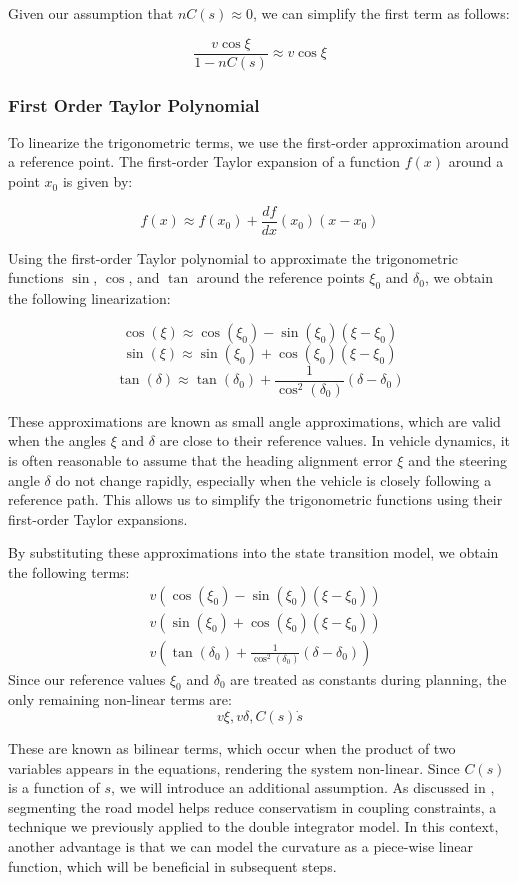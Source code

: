 Given our assumption that $nC(s) \approx 0$, we can simplify the first term as follows:

\[ \frac{v \cos\xi}{1 - nC(s)} \approx v
	\cos\xi \]

\subsubsection{First Order Taylor Polynomial} To linearize the trigonometric terms, we use the first-order
approximation around a reference point.
The first-order Taylor expansion of a function $f(x)$ around a point $x_0$ is given by:

\[ f(x) \approx f(x_0) + \frac{df}{dx}
	(x_0) (x - x_0) \]

Using the first-order Taylor polynomial to approximate the trigonometric functions $\sin$, $\cos$, and $\tan$
around the reference points $\xi_0$ and $\delta_0$, we obtain the following linearization:

\[ \cos(\xi) \approx \cos(\xi_0) -
	\sin(\xi_0) (\xi - \xi_0) \] \[ \sin(\xi) \approx \sin(\xi_0) + \cos(\xi_0) (\xi - \xi_0) \] \[ \tan(\delta) \approx \tan(\delta_0) +
	\frac{1}{\cos^2(\delta_0)} (\delta - \delta_0) \]

These approximations are known as small angle approximations, which are valid
when the angles $\xi$ and $\delta$ are close to their reference values.
In vehicle dynamics, it is often reasonable to assume that the heading alignment error $\xi$ and the steering angle $\delta$ do not change rapidly,
especially when the vehicle is closely following a reference path.
This allows us to simplify the trigonometric functions using their first-order Taylor expansions.

By substituting these approximations into the state transition model, we obtain the following terms:
\begin{align*}
	 & v (\cos(\xi_0) - \sin(\xi_0) (\xi - \xi_0))                         \\
	 & v (\sin(\xi_0) + \cos(\xi_0) (\xi - \xi_0))                         \\
	 & v (\tan(\delta_0) + \frac{1}{\cos^2(\delta_0)} (\delta - \delta_0))
\end{align*}
Since our reference values $\xi_0$ and $\delta_0$ are treated as constants during planning, the only remaining non-linear terms are: $$v \xi, v
	\delta, C(s)\dot{s}$$

These are known as bilinear terms, which occur when the product of two variables appears in the equations,
rendering the system non-linear.
Since $C(s)$ is a function of $s$, we will introduce an additional assumption.
As discussed in , segmenting the road model helps reduce conservatism in coupling constraints, a technique
we previously applied to the double integrator model.
In this context, another advantage is that we can model the curvature as a piece-wise linear function, which will be beneficial in subsequent steps.

